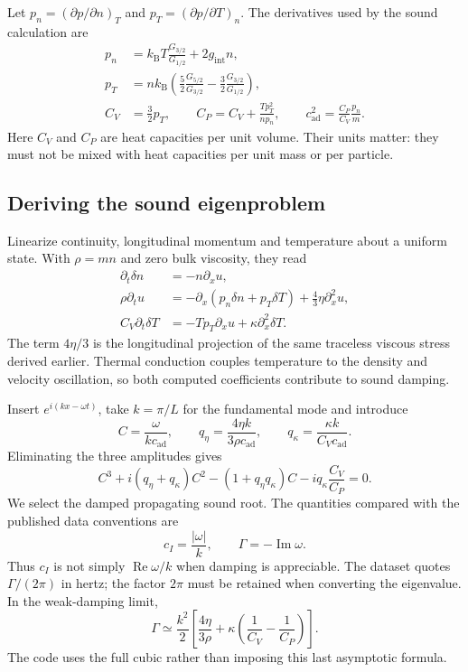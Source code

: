 Let $p_n=(\partial p/\partial n)_T$ and $p_T=(\partial p/\partial T)_n$.
The derivatives used by the sound calculation are
\begin{align}
 p_n&=k_{\mathrm B}T\frac{G_{3/2}}{G_{1/2}}+2g_{\mathrm{int}}n,\\
 p_T&=nk_{\mathrm B}\left(\frac52\frac{G_{5/2}}{G_{3/2}}
                  -\frac32\frac{G_{3/2}}{G_{1/2}}\right),\\
 C_V&=\frac32p_T,\qquad
 C_P=C_V+\frac{Tp_T^2}{np_n},\qquad
 c_{\mathrm{ad}}^2=\frac{C_P}{C_V}\frac{p_n}{m}.
 \label{qt:thermo}
\end{align}
Here $C_V$ and $C_P$ are heat capacities per unit volume. Their units matter:
they must not be mixed with heat capacities per unit mass or per particle.

\subsection{Deriving the sound eigenproblem}
Linearize continuity, longitudinal momentum and temperature about a uniform
state. With $\rho=mn$ and zero bulk viscosity, they read
\begin{align}
 \partial_t\delta n&=-n\partial_xu,\\
 \rho\partial_tu&=-\partial_x(p_n\delta n+p_T\delta T)
                         +\frac43\eta\partial_x^2u,\\
 C_V\partial_t\delta T&=-Tp_T\partial_xu+\kappa\partial_x^2\delta T.
 \label{qt:soundeq}
\end{align}
The term $4\eta/3$ is the longitudinal projection of the same traceless
viscous stress derived earlier. Thermal conduction couples temperature to
the density and velocity oscillation, so both computed coefficients contribute
to sound damping.

Insert $e^{i(kx-\omega t)}$, take $k=\pi/L$ for the fundamental mode and
introduce
\begin{equation}
 C=\frac\omega{kc_{\mathrm{ad}}},\qquad
 q_\eta=\frac{4\eta k}{3\rho c_{\mathrm{ad}}},\qquad
 q_\kappa=\frac{\kappa k}{C_Vc_{\mathrm{ad}}}.
\end{equation}
Eliminating the three amplitudes gives
\begin{equation}
 C^3+i(q_\eta+q_\kappa)C^2
 -(1+q_\eta q_\kappa)C
 -iq_\kappa\frac{C_V}{C_P}=0.
 \label{qt:cubic}
\end{equation}
We select the damped propagating sound root. The quantities compared with
the published data conventions are
\begin{equation}
 c_I=\frac{|\omega|}{k},\qquad \Gamma=-\operatorname{Im}\omega.
\end{equation}
Thus $c_I$ is not simply $\operatorname{Re}\omega/k$ when damping is
appreciable. The dataset quotes $\Gamma/(2\pi)$ in hertz; the factor $2\pi$
must be retained when converting the eigenvalue. In the weak-damping limit,
\begin{equation}
 \Gamma\simeq\frac{k^2}{2}
 \left[\frac{4\eta}{3\rho}+\kappa\left(\frac1{C_V}-\frac1{C_P}\right)\right].
\end{equation}
The code uses the full cubic rather than imposing this last asymptotic formula.

